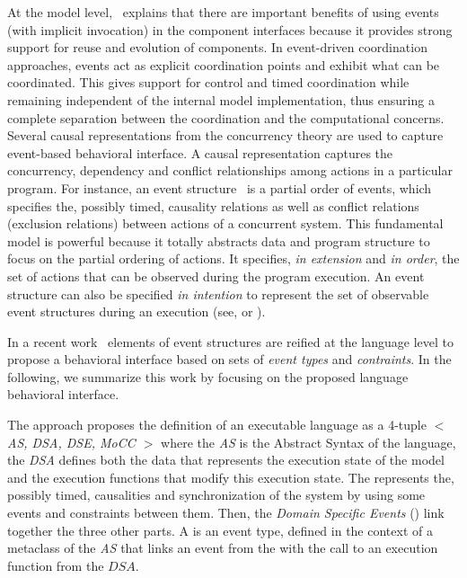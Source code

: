 At the model level,~\cite{garlansoftarchbib} explains that there are important benefits of using events (with implicit invocation) in the component interfaces because it provides strong support for reuse and evolution of components. In event-driven coordination approaches, events act as explicit coordination points and exhibit what can be coordinated. This gives support for control and timed coordination while remaining independent of the internal model implementation, thus ensuring a complete separation between the coordination and the computational concerns. Several causal representations from the concurrency theory are used to capture event-based behavioral interface. A causal representation captures the concurrency, dependency and conflict relationships among actions in a particular program. For instance, an event structure~\cite{eventStructures} is a partial order of events, which specifies the, possibly timed, causality relations as well as conflict relations (\ie exclusion relations) between actions of a concurrent system. This fundamental model is powerful because it totally abstracts data and program structure to focus on the partial ordering of actions. It specifies, \emph{in extension} and \emph{in order}, the set of actions that can be observed during the program execution. An event structure can also be specified \emph{in intention} to represent the set of observable event structures during an execution (see, \eg\cite{ccslbib} or \cite{tagmachinebib}).

In a recent work~\cite{sle13-combemale} elements of event structures are reified at the language level to propose a behavioral interface based on sets of \emph{event types} and \emph{contraints}. In the following, we summarize this work by focusing on the proposed language behavioral interface. 

The approach proposes the definition of an executable language as a 4-tuple \emph{$<$ AS, DSA, DSE, MoCC $>$} where the \emph{AS} is the Abstract Syntax of the language, the \emph{DSA} defines both the data that represents the execution state of the model and the execution functions that modify this execution state. The \mocc represents the, possibly timed, causalities and synchronization of the system by using some events and constraints between them. Then, the \emph{Domain Specific Events} (\dse) link together the three other parts. A \dse is an event type, defined in the context of a metaclass of the \emph{AS} that links an event from the \mocc with the call to an execution function from the $DSA$. 

